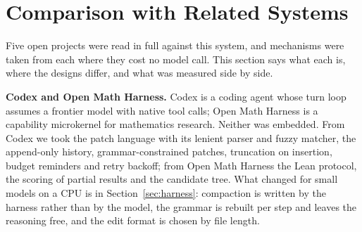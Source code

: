 \section{Comparison with Related Systems}
\label{sec:comparison}

Five open projects were read in full against this system, and mechanisms were
taken from each where they cost no model call. This section says what each
is, where the designs differ, and what was measured side by side.

\textbf{Codex and Open Math Harness.} Codex \cite{openaicodex2026} is a
coding agent whose turn loop assumes a frontier model with native tool calls;
Open Math Harness \cite{openmathharness2026} is a capability microkernel for
mathematics research. Neither was embedded. From Codex we took the patch
language with its lenient parser and fuzzy matcher, the append-only history,
grammar-constrained patches, truncation on insertion, budget reminders and
retry backoff; from Open Math Harness the Lean protocol, the scoring of
partial results and the candidate tree. What changed for small models on a
CPU is in Section~\ref{sec:harness}: compaction is written by the harness
rather than by the model, the grammar is rebuilt per step and leaves the
reasoning free, and the edit format is chosen by file length.


